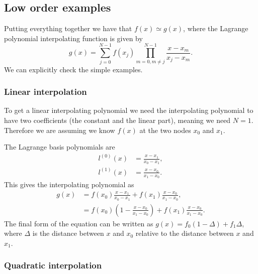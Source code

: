 \subsection{Low order examples}

Putting everything together we have that $f(x) \simeq g(x)$, where the Lagrange polynomial interpolating function is given by
%
\begin{equation}
  g(x) = \sum_{j=0}^{N-1} f(x_{j}) \prod_{m=0, m \ne j}^{N-1} \frac{x - x_m}{x_j - x_m}.
\end{equation}
%
We can explicitly check the simple examples.

\subsubsection{Linear interpolation}

To get a linear interpolating polynomial we need the interpolating polynomial to have two coefficients (the constant and the linear part), meaning we need $N=1$. Therefore we are assuming we know $f(x)$ at the two nodes $x_0$ and $x_1$.

The Lagrange basis polynomials are
%
\begin{align}
  l^{(0)}(x) &= \frac{x - x_1}{x_0 - x_1}, \\
  l^{(1)}(x) &= \frac{x - x_0}{x_1 - x_0}.
\end{align}
%
This gives the interpolating polynomial as
%
\begin{align}
  g(x) &= f(x_0) \frac{x - x_1}{x_0 - x_1} + f(x_1) \frac{x - x_0}{x_1 - x_0}, \\
  &= f(x_0) \left( 1 - \frac{x - x_0}{x_1 - x_0} \right) + f(x_1) \frac{x - x_0}{x_1 - x_0}.
\end{align}
%
The final form of the equation can be written as $g(x) = f_0 (1 - \Delta) + f_1 \Delta$, where $\Delta$ is the distance between $x$ and $x_0$ relative to the distance between $x$ and $x_1$.

\subsubsection{Quadratic interpolation}

